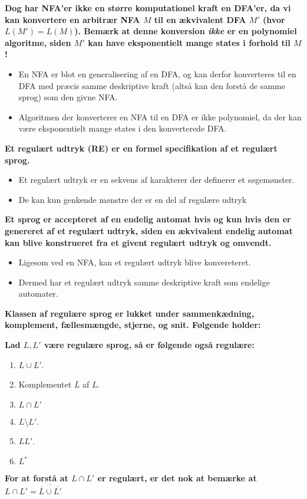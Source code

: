 \noindent
\textbf{Dog har NFA'er ikke en større komputationel kraft en DFA'er, da vi kan konvertere en arbitrær NFA $M$ til en ækvivalent DFA $M'$ (hvor $L(M') = L(M)$). Bemærk at denne konversion \textit{ikke} er en polynomiel algoritme, siden $M'$ kan have eksponentielt mange states i forhold til $M$!}
\begin{itemize}
	\item En NFA er blot en generalisering af en DFA, og kan derfor konverteres til en DFA med præcis samme deskriptive kraft (altså kan den forstå de samme sprog) som den givne NFA.
	\item Algoritmen der konverterer en NFA til en DFA er ikke polynomiel, da der kan være eksponentielt mange states i den konverterede DFA.
\end{itemize}
\noindent
\textbf{Et regulært udtryk (RE) er en formel specifikation af et regulært sprog.}\\
\begin{itemize}
	\item Et regulært udtryk er en sekvens af karakterer der definerer et søgemønster.
	\item De kan kun genkende mønstre der er en del af regulære udtryk
\end{itemize}
\noindent
\textbf{Et sprog er accepteret af en endelig automat hvis og kun hvis den er genereret af et regulært udtryk, siden en ækvivalent endelig automat kan blive konstrueret fra et givent regulært udtryk og omvendt.}
\begin{itemize}
	\item Ligesom ved en NFA, kan et regulært udtryk blive konvereteret.
	\item Dermed har et regulært udtryk samme deskriptive kraft som endelige automater.
\end{itemize}
\textbf{Klassen af regulære sprog er lukket under sammenkædning, komplement, fællesmængde, stjerne, og snit. Følgende holder:}

\textbf{Lad $L, L'$ være regulære sprog, så er følgende også regulære:}
\begin{enumerate}
	\item $L \cup L'$.
	\item Komplementet $\overline{L}$ af $L$.
	\item $L \cap L'$
	\item $L \setminus L'$.
	\item $LL'$.
	\item $L^{*}$
\end{enumerate}
\textbf{For at forstå at $L \cap L'$ er regulært, er det nok at bemærke at $L \cap L' = \overline{\overline{L} \cup \overline{L'}}$}

